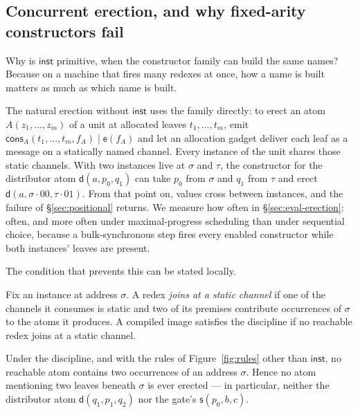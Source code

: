 \documentclass[acmsmall,screen,review,anonymous]{acmart}
\newcommand{\dd}{\mathsf{d}}
\newcommand{\sy}{\mathsf{s}}
\newcommand{\ev}{\mathsf{e}}
\newcommand{\cons}{\mathsf{cons}}
\newcommand{\inst}{\mathsf{inst}}
\begin{document}
\subsection{Concurrent erection, and why fixed-arity constructors fail}
\label{sec:mixing}

Why is $\inst$ primitive, when the constructor family can build the same
names? Because on a machine that fires many redexes at once, how a name is
built matters as much as which name is built.

The natural erection without $\inst$ uses the family directly: to erect an
atom $A(z_{1},\dots,z_{m})$ of a unit at allocated leaves $t_{1},\dots,t_{m}$,
emit $\cons_{A}(t_{1},\dots,t_{m},f_{A}) \mid \ev(f_{A})$ and let an
allocation gadget deliver each leaf as a message on a statically named
channel. Every instance of the unit shares those static channels. With two
instances live at $\sigma$ and $\tau$, the constructor for the distributor atom
$\dd(a,p_{0},q_{1})$ can take $p_{0}$ from $\sigma$ and $q_{1}$ from $\tau$ and
erect $\dd(a,\sigma\cdot00,\tau\cdot01)$. From that point on, values cross
between instances, and the failure of \S\ref{sec:positional} returns. We
measure how often in \S\ref{sec:eval-erection}: often, and more often under
maximal-progress scheduling than under sequential choice, because a
bulk-synchronous step fires every enabled constructor while both instances'
leaves are present.

The condition that prevents this can be stated locally.

\begin{definition}
\label{def:dstar}
Fix an instance at address $\sigma$. A redex \emph{joins at a static channel}
if one of the channels it consumes is static and two of its premises
contribute occurrences of $\sigma$ to the atoms it produces. A compiled image
satisfies the discipline if no reachable redex joins at a static channel.
\end{definition}

\begin{proposition}
\label{prop:multiplicity}
Under the discipline, and with the rules of Figure~\ref{fig:rules} other
than $\inst$, no reachable atom contains two occurrences of an address
$\sigma$. Hence no atom mentioning two leaves beneath $\sigma$ is ever erected
--- in particular, neither the distributor atom $\dd(q_{1},p_{1},q_{2})$ nor
the gate's $\sy(p_{0},b,c)$.
\end{proposition}
\end{document}

